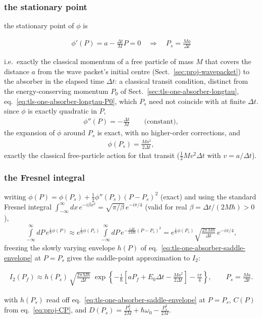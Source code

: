 \subsubsection{the stationary point}
the stationary point of $\phi$ is
\begin{importantbox}
    \begin{align}
        \phi'(P) = a - \frac{\Delta t}{M}P = 0 \quad\Longrightarrow\quad P_s = \frac{Ma}{\Delta t}\label{eq:tls-one-absorber-saddle-point}
    \end{align}
\end{importantbox}
i.e.\ exactly the classical momentum of a free particle of mass $M$ that covers the distance $a$ from the wave packet's initial centre (Sect.~\ref{sec:proj-wavepacket}) to the absorber in the elapsed time $\Delta t$: a classical transit condition, distinct from the energy-conserving momentum $P_0$ of Sect.~\ref{sec:tls-one-absorber-longtau}, eq.~\eqref{eq:tls-one-absorber-longtau-P0}, which $P_s$ need not coincide with at finite $\Delta t$. since $\phi$ is exactly quadratic in $P$,
\begin{align}
    \phi''(P) = -\frac{\Delta t}{M}\qquad\text{(constant)},
\end{align}
the expansion of $\phi$ around $P_s$ is exact, with no higher-order corrections, and
\begin{align}
    \phi(P_s) = \frac{Ma^2}{2\Delta t},
\end{align}
exactly the classical free-particle action for that transit ($\frac12Mv^2\Delta t$ with $v=a/\Delta t$).

\subsubsection{the Fresnel integral}
writing $\phi(P)=\phi(P_s)+\frac12\phi''(P_s)(P-P_s)^2$ (exact) and using the standard Fresnel integral $\int_{-\infty}^{\infty}dx\, e^{-i\beta x^2}=\sqrt{\pi/\beta}\,e^{-i\pi/4}$ (valid for real $\beta=\Delta t/(2M\hbar)>0$),
\begin{align}
    \int\limits_{-\infty}^{\infty}dP\, e^{\frac{i}{\hbar}\phi(P)} \approx e^{\frac{i}{\hbar}\phi(P_s)}\int\limits_{-\infty}^{\infty}dP\, e^{-\frac{i\Delta t}{2M\hbar}(P-P_s)^2} = e^{\frac{i}{\hbar}\phi(P_s)}\sqrt{\frac{2\pi M\hbar}{\Delta t}}\,e^{-i\pi/4},
\end{align}
freezing the slowly varying envelope $h(P)$ of eq.~\eqref{eq:tls-one-absorber-saddle-envelope} at $P=P_s$ gives the saddle-point approximation to $I_2$:
\begin{importantbox}
    \begin{align}
        I_2(P_f) \approx h(P_s)\,\sqrt{\frac{2\pi M\hbar}{\Delta t}}\;\exp\left\{-\frac{i}{\hbar}\left[aP_f+E_0\Delta t-\frac{Ma^2}{2\Delta t}\right]-\frac{i\pi}{4}\right\},\qquad P_s=\frac{Ma}{\Delta t}.\label{eq:tls-one-absorber-finite-tau-amplitude}
    \end{align}
\end{importantbox}
with $h(P_s)$ read off eq.~\eqref{eq:tls-one-absorber-saddle-envelope} at $P=P_s$, $C(P)$ from eq.~\eqref{eq:proj-CP}, and $D(P_s)=\frac{P_f^2}{2M}+\hbar\omega_0-\frac{P_s^2}{2M}$.

